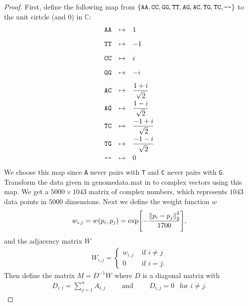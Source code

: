 \documentclass{article} %
\theoremstyle{plain}
\def\Cx{\mathbb{C}}
\numberwithin{equation}{section} %
\numberwithin{figure}{section} %
\numberwithin{table}{section} %
\begin{document}
\begin{proof}
    First, define the following map from $\{\texttt{AA}, \texttt{CC}, \texttt{GG}, \texttt{TT}, \texttt{AG}, \texttt{AC}, \texttt{TG}, \texttt{TC}, \texttt{-\hspace{0pt}-}\}$ to the unit cirtcle (and $0$) in $\Cx$:
    \begin{align*}
        \begin{array}{rcl}
            \texttt{AA} &\mapsto& 1 \\[0.3cm]
            \texttt{TT} &\mapsto& -1 \\[0.3cm]
            \texttt{CC} &\mapsto& i \\[0.3cm]
            \texttt{GG} &\mapsto& -i \\[0.3cm]
            \texttt{AC} &\mapsto& \dfrac{1+i}{\sqrt{2}} \\[0.3cm]
            \texttt{AG} &\mapsto& \dfrac{1-i}{\sqrt{2}} \\[0.3cm]
            \texttt{TC} &\mapsto& \dfrac{-1+i}{\sqrt{2}} \\[0.3cm]
            \texttt{TG} &\mapsto& \dfrac{-1-i}{\sqrt{2}} \\[0.3cm]
            \texttt{-\hspace{0pt}-} &\mapsto& 0
        \end{array}
    \end{align*}
    We choose this map since \texttt{A} never pairs with \texttt{T} and \texttt{C} never pairs with \texttt{G}.  Transform the data given in genomedata.mat in to complex vectors using this map.  We get a $5000\times1043$ matrix of complex numbers, which represents $1043$ data points in $5000$ dimensions.  Next we define the weight function $w$
    \begin{align*}
        w_{i,j} = w(p_i, p_j) = \exp[-\frac{\norm{p_i - p_j}_2^2}{1700}],
    \end{align*}
    and the adjacency matrix $W$
    \begin{align*}
        W_{i,j} = \begin{cases}
            w_{i,j} & \text{ if } i \neq j \\
            0 & \text{ if } i = j.
        \end{cases}
    \end{align*}
    Then define the matrix $M = D^{-1}W$ where $D$ is a diagonal matrix with
    \begin{align*}
        D_{i,i} = \sum_{j=1}^n A_{i,j} \qquad \text{ and } \qquad D_{i,j} = 0\ \ \text{ for } i \neq j.
    \end{align*}

\end{proof}
\end{document}
